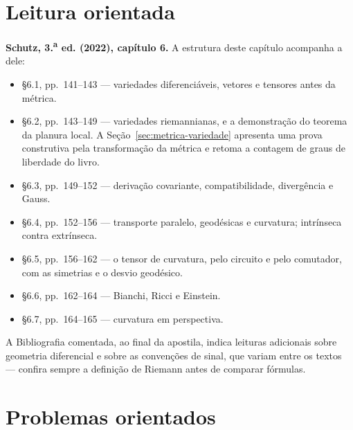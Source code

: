 \documentclass[12pt,a4paper,oneside]{book}
\theoremstyle{rgplain}
\theoremstyle{rgremark}
\begin{document}
\section{Leitura orientada}
\label{sec:leitura-cap6}

\begin{leitura}
\textbf{Schutz, 3.\textsuperscript{a} ed. (2022), capítulo 6.} A estrutura
deste capítulo acompanha a dele:
\begin{itemize}
  \item \S6.1, pp.~141--143 --- variedades diferenciáveis, vetores e tensores
  antes da métrica.
  \item \S6.2, pp.~143--149 --- variedades riemannianas, e a demonstração do
  teorema da planura local. A Seção~\ref{sec:metrica-variedade} apresenta
  uma prova construtiva pela transformação da métrica e retoma a contagem
  de graus de liberdade do livro.
  \item \S6.3, pp.~149--152 --- derivação covariante, compatibilidade,
  divergência e Gauss.
  \item \S6.4, pp.~152--156 --- transporte paralelo, geodésicas e curvatura;
  intrínseca contra extrínseca.
  \item \S6.5, pp.~156--162 --- o tensor de curvatura, pelo circuito e pelo
  comutador, com as simetrias e o desvio geodésico.
  \item \S6.6, pp.~162--164 --- Bianchi, Ricci e Einstein.
  \item \S6.7, pp.~164--165 --- curvatura em perspectiva.
\end{itemize}
A Bibliografia comentada, ao final da apostila, indica leituras adicionais
sobre geometria diferencial e sobre as convenções de sinal, que variam entre
os textos --- confira sempre a definição de Riemann antes de comparar
fórmulas.
\end{leitura}


\section{Problemas orientados}
\end{document}
